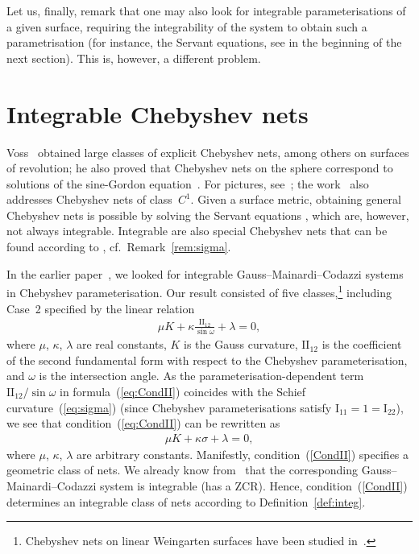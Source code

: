\documentclass[pdftex]{sigma}
\def\I#1#2{\mathrm{I}_{#1#2}}
\def\II#1#2{\mathrm{II}_{#1#2}}
\def\m{\mu}
\def\k{\kappa}
\def\l{\lambda}
\def\eqref#1{{\rm(\ref{#1})}}
\numberwithin{equation}{section}
\begin{document}
Let us, finally, remark that one may also look for integrable parameterisations
of a given surface, requiring the integrability of the system
to obtain such a parametrisation
(for instance, the Servant equations,
see in the beginning of the next section).
This is, however, a different problem.

\section{Integrable Chebyshev nets}\label{sect:int:Cheb}

Voss~\cite{AV-1869} obtained large classes of explicit Chebyshev nets,
among others on surfaces of revolution;
he also proved that Chebyshev nets on the sphere correspond to solutions
of the sine-Gordon equation~\cite[Section~3]{AV-1869}.
For pictures, see~\cite{H-O-O,M-T-1956};
the work~\cite{H-O-O} also addresses Chebyshev nets of class~$C^1$.
Given a surface metric, obtaining general Chebyshev nets is possible by
solving the Servant equations \cite[equation~(3)]{MS-1904}, which are, however,
not always integrable.
Integrable are also special Chebyshev nets that can be found
according to \cite[Section~2.2]{WKS-2007},
cf.\ Remark~\ref{rem:sigma}.

In the earlier paper~\cite[Section~2]{K-M}, we looked for integrable
Gauss--Mainardi--Codazzi systems in Chebyshev parameterisation.
Our result consisted of five classes,\footnote{Chebyshev nets on linear Weingarten surfaces have been studied in~\cite{DL-2023}.}
including Case~2 specified by the linear relation
\begin{gather}\label{eq:CondII}
\mu K + \kappa\frac{\II12}{\sin\omega} + \lambda = 0,
\end{gather}
where $\mu$, $\kappa$, $\lambda$ are real constants, $K$ is the Gauss curvature,
$\II12$ is the coefficient of the second fundamental form with respect to the
Chebyshev parameterisation, and $\omega$ is the intersection angle.
As the parameterisation-dependent term $\II12/{\sin\omega}$ in
formula~\eqref{eq:CondII} coincides with the
Schief curvature~\eqref{eq:sigma}
(since Chebyshev parameterisations satisfy $\I11 = 1 = \I22$),
we see that condition~\eqref{eq:CondII} can be rewritten as
\begin{gather}\label{CondII}
\m K + \k \sigma + \l = 0,
\end{gather}
where $\m$, $\k$, $\l$ are arbitrary constants.
Manifestly, condition~\eqref{CondII} specifies a geometric
class of nets.
We already know from~\cite{K-M} that
the corresponding Gauss--Mainardi--Codazzi system is integrable
(has a ZCR).
Hence, condition~\eqref{CondII}
determines an integrable class of nets according to Definition~\ref{def:integ}.
\end{document}
